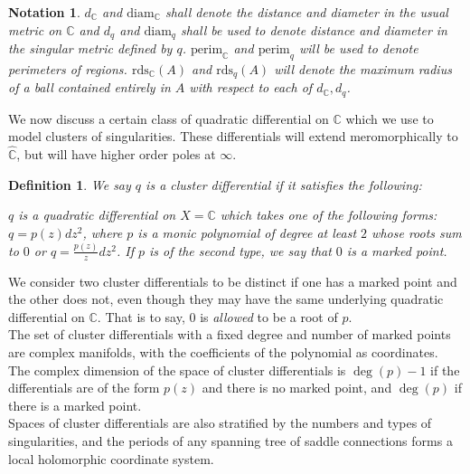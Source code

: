 \documentclass[12pt]{article}
\newtheorem{definition}[theorem]{Definition}
\newtheorem{notation}[theorem]{Notation}
\newcommand{\cc}{\mathbb{C}}
\newcommand{\diam}{\mathrm{diam}}
\newcommand{\perim}{\mathrm{perim}}
\newcommand{\rds}{\mathrm{rds}}
\begin{document}
\begin{notation}$d_\cc$ and $\diam_\cc$ shall denote the distance and diameter in the usual metric on $\cc$ and $d_q$ and $\diam_q$ shall be used to denote distance and diameter in the singular metric defined by $q$. $\perim_\cc$ and $\perim_q$ will be used to denote perimeters of regions. $\rds_\cc(A)$ and $\rds_q(A)$ will denote the maximum radius of a ball contained entirely in $A$ with respect to each of $d_\cc, d_q$. \end{notation}

\noindent We now discuss a certain class of quadratic differential on $\cc$ which we use to model clusters of singularities. These differentials will extend meromorphically to $\hat{\cc}$, but will have higher order poles at $\infty$.\\

\begin{definition}We say $q$ is a \emph{cluster differential} if it satisfies the following:

$q$ is a quadratic differential on $X = \cc$ which takes one of the following forms: $q = p(z)dz^2$, where $p$ is a monic polynomial of degree at least $2$ whose roots sum to $0$ or $q = \frac{p(z)}{z}dz^2$. If $p$ is of the second type, we say that $0$ is a \emph{marked point}.\end{definition}

\noindent We consider two cluster differentials to be distinct if one has a marked point and the other does not, even though they may have the same underlying quadratic differential on $\cc$. That is to say, $0$ is \emph{allowed} to be a root of $p$.\\

\noindent The set of cluster differentials with a fixed degree and number of marked points are complex manifolds, with the coefficients of the polynomial as coordinates. The complex dimension of the space of cluster differentials is $\deg(p) - 1$ if the differentials are of the form $p(z)$ and there is no marked point, and $\deg(p)$ if there is a marked point.\\

\noindent Spaces of cluster differentials are also stratified by the numbers and types of singularities, and the periods of any spanning tree of saddle connections forms a local holomorphic coordinate system.\\
\end{document}
